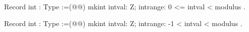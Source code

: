   Record int : Type :=(@\vspace{-0.06cm}@)
    mkint { intval: Z; intrange: 0 <= intval < modulus }.

  Record int : Type :=(@\vspace{-0.06cm}@)
    mkint { intval: Z; intrange: -1 < intval < modulus }.
